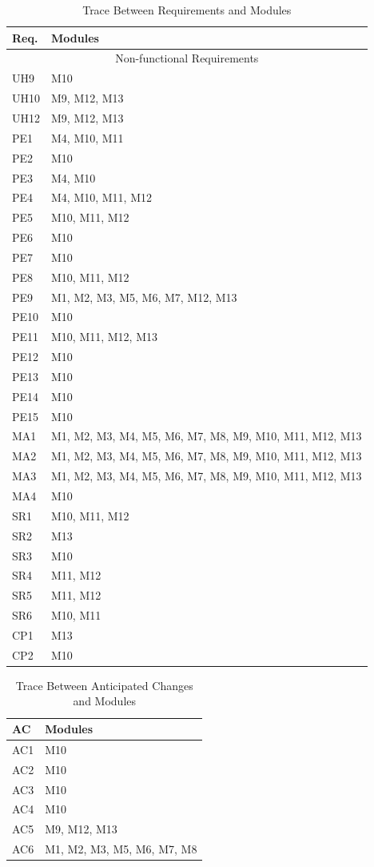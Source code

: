 \documentclass[12pt, titlepage]{article}
\begin{document}
\begin{table}[H]
\centering
\begin{tabular}{p{} p{}}
\toprule
\textbf{Req.} & \textbf{Modules}\\
\midrule
\multicolumn{2}{c}{Non-functional Requirements}\\
\midrule
UH9 & M10\\
UH10 & M9, M12, M13\\
UH12 & M9, M12, M13\\
PE1 & M4, M10, M11\\
PE2 & M10\\
PE3 & M4, M10\\
PE4 & M4, M10, M11, M12\\
PE5 & M10, M11, M12\\
PE6 & M10\\
PE7 & M10\\
PE8 & M10, M11, M12\\
PE9 & M1, M2, M3, M5, M6, M7, M12, M13\\
PE10 & M10\\
PE11 & M10, M11, M12, M13\\
PE12 & M10\\
PE13 & M10\\
PE14 & M10\\
PE15 & M10\\
MA1 & M1, M2, M3, M4, M5, M6, M7, M8, M9, M10, M11, M12, M13\\
MA2 & M1, M2, M3, M4, M5, M6, M7, M8, M9, M10, M11, M12, M13\\
MA3 & M1, M2, M3, M4, M5, M6, M7, M8, M9, M10, M11, M12, M13\\
MA4 & M10\\
SR1 & M10, M11, M12\\
SR2 & M13\\
SR3 & M10\\
SR4 & M11, M12\\
SR5 & M11, M12\\
SR6 & M10, M11\\
CP1 & M13\\
CP2 & M10\\

\bottomrule
\end{tabular}
\caption{Trace Between Requirements and Modules}
\label{TblRT}
\end{table}

\begin{table}[H]
\centering
\begin{tabular}{p{} p{}}
\toprule
\textbf{AC} & \textbf{Modules}\\
\midrule
AC1 & M10\\
AC2 & M10\\
AC3 & M10\\
AC4 & M10\\
AC5 & M9, M12, M13\\
AC6 & M1, M2, M3, M5, M6, M7, M8\\
\bottomrule
\end{tabular}
\caption{Trace Between Anticipated Changes and Modules}
\label{TblACT}
\end{table}
\end{document}
